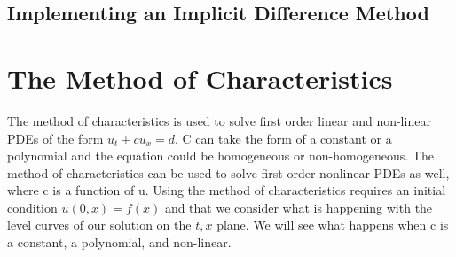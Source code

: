 \documentclass{article}
\newcommand{\red}[1]{\textcolor{red}{#1}}
\newcommand{\blue}[1]{\textcolor{blue}{#1}}
\begin{document}
    
    
    

\subsection{Implementing an Implicit Difference Method}
    
    
\section{The Method of Characteristics}
The method of characteristics is used to solve first order linear and non-linear PDEs of the form $u_t+cu_x = d$.
C can take the form of a constant or a polynomial and the equation could be homogeneous or non-homogeneous. The method of characteristics can be used to solve first order nonlinear PDEs as well, where c is a function of u. Using the method of characteristics requires an initial condition $u(0,x)=f(x)$ and that we consider what is happening with the level curves of our solution on the $t,x$ plane. We will see what happens when c is a constant, a polynomial, and non-linear. 
\end{document}
